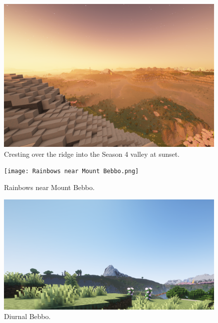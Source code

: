 \begin{figure}[H]
	\centering
	\includegraphics[width=\linewidth]{Cresting over the ridge into the Season 4 Valley.png}
	\caption{Cresting over the ridge into the Season 4 valley at sunset.}
\end{figure}

\begin{figure}[H]
	\centering
	\texttt{[image: Rainbows near Mount Bebbo.png]}
	\caption{Rainbows near Mount Bebbo.}
\end{figure}

\begin{figure}[H]
	\centering
	\includegraphics[width=\linewidth]{Day View of Mt Bebbo.png}
	\caption{Diurnal Bebbo.}
	
\end{figure}
\newpage
